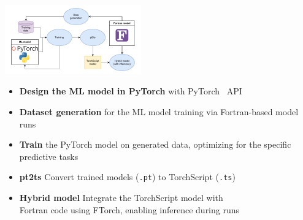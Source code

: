 \begin{tikzfigure}
    \includegraphics[width=0.44\textwidth]{figures/offline-training-diagram.pdf}
\end{tikzfigure}
\begin{itemize}
    \setlength{\itemsep}{0pt}
    \item \textbf{Design the ML model in PyTorch} with PyTorch \faPython~API
    \item \textbf{Dataset generation} for the ML model training via Fortran-based model runs
    \item \textbf{Train} the PyTorch model on generated data, optimizing for the specific predictive tasks
    \item \textbf{pt2ts} Convert trained  models (\texttt{.pt}) to TorchScript (\texttt{.ts})
    \item \textbf{Hybrid model} Integrate the TorchScript model with\\ Fortran code using FTorch, enabling inference during runs
\end{itemize}
